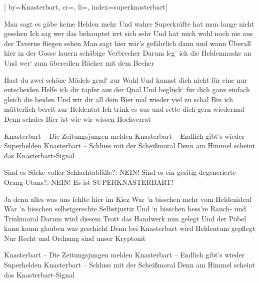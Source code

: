 
[%
    by={Knasterbart},
    cr={},
    li={},
    index={superknasterbart}]


    \label{superknasterbart}

    \beginverse\memorize[chorus]
        Man sagt es gäbe keine Helden mehr
        Und wahre Superkräfte hat man lange nicht gesehen
        Ich sag wer das behauptet irrt sich sehr
        Und hat mich wohl noch nie aus der Taverne fliegen sehen
        \brk
        Man sagt hier wär's gefährlich dann und wann
        Überall hier in der Gosse lauern schäbige Verbrecher
        Darum leg' ich die Heldenmaske an
        Und wer‘ zum überedlen Rächer mit dem Becher
    \endverse

    \beginverse\replay[verse]
        Hast du zwei schöne Mädels grad‘ zur Wahl
        Und kannst dich nicht für eine nur entscheiden
        Helfe ich dir tapfer aus der Qual
        Und beglück‘ für dich ganz einfach gleich die beiden
        \brk
        Und wir dir all dein Bier mal wieder viel zu schal
        Bin ich mütterlich bereit zur Heldentat
        Ich trink es aus und rette dich gern wiedermal
        Denn schales Bier ist wie wir wissen Hochverrat
    \endverse

    \beginchorus\replay[chorus]
        Knasterbart – Die Zeitungsjungen melden
        Knasterbart – Endlich gibt's wieder Superhelden
        Knasterbart – Schluss mit der Scheißmoral
        Denn am Himmel scheint das Knasterbart-Signal
    \endchorus

    \beginverse*\memorize[bridge]
        Sind es Säcke voller Schlachtabfälle?: NEIN!
        Sind es ein gesitig degenerierte Orang-Utans?: NEIN!
        Es ist SUPERKNASTERBART!
    \endverse

    \beginverse\replay[verse]
        Ja denn alles was uns fehlte hier im Kiez
        War 'n bisschen mehr vom Heldenideal
        War 'n bisschen selbstgerechte Selbstjustiz
        Und ‘n bisschen bess're Rauch- und Trinkmoral
        \brk
        Darum wird diesem Trott das Handwerk nun gelegt
        Und der Pöbel kann kaum glauben was geschieht
        Denn bei Knasterbart wird Heldentum gepflegt
        Nur Recht und Ordnung sind unser Kryptonit
    \endverse

    \beginchorus\replay[chorus]
        Knasterbart – Die Zeitungsjungen melden
        Knasterbart – Endlich gibt's wieder Superhelden
        Knasterbart – Schluss mit der Scheißmoral
        Denn am Himmel scheint das Knasterbart-Signal
    \endchorus


